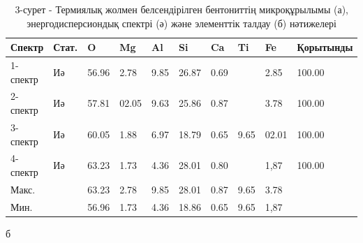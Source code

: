 \begin{table}[H]
\centering
\begin{tabular}{|l|l|l|l|l|l|l|l|l|l|}
\hline
Спектр & Стат. & O & Mg & Al & Si & Ca & Ti & Fe & Қорытынды \\ \hline
1-спектр & Иә & 56.96 & 2.78 & 9.85 & 26.87 & 0.69 &  & 2.85 & 100.00 \\ \hline
2-спектр & Иә & 57.81 & 02.05 & 9.63 & 25.86 & 0.87 &  & 3.78 & 100.00 \\ \hline
3-спектр & Иә & 60.05 & 1.88 & 6.97 & 18.79 & 0.65 & 9.65 & 02.01 & 100.00 \\ \hline
4-спектр & Иә & 63.23 & 1.73 & 4.36 & 28.01 & 0.80 &  & 1,87 & 100.00 \\ \hline
Макс. &  & 63.23 & 2.78 & 9.85 & 28.01 & 0.87 & 9.65 & 3.78 &  \\ \hline
Мин. &  & 56.96 & 1.73 & 4.36 & 18.86 & 0.65 & 9.65 & 1,87 &  \\ \hline
\end{tabular}
\caption*{б}
\caption*{3-сурет - Термиялық жолмен белсендірілген бентониттің микроқұрылымы (а), энергодисперсиондық спектрі (ә) және элементтік талдау (б) нәтижелері}
\end{table}

